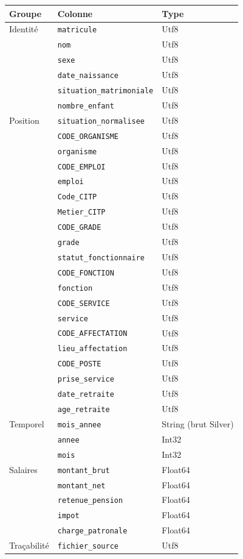 \documentclass[12pt,a4paper,french]{report}
\begin{document}
\begin{longtable}{lll}
  \toprule
  \textbf{Groupe} & \textbf{Colonne} & \textbf{Type} \\
  \midrule
  \endhead
  Identité & \texttt{matricule} & Utf8 \\
  & \texttt{nom} & Utf8 \\
  & \texttt{sexe} & Utf8 \\
  & \texttt{date\_naissance} & Utf8 \\
  & \texttt{situation\_matrimoniale} & Utf8 \\
  & \texttt{nombre\_enfant} & Utf8 \\
  \midrule
  Position & \texttt{situation\_normalisee} & Utf8 \\
  & \texttt{CODE\_ORGANISME} & Utf8 \\
  & \texttt{organisme} & Utf8 \\
  & \texttt{CODE\_EMPLOI} & Utf8 \\
  & \texttt{emploi} & Utf8 \\
  & \texttt{Code\_CITP} & Utf8 \\
  & \texttt{Metier\_CITP} & Utf8 \\
  & \texttt{CODE\_GRADE} & Utf8 \\
  & \texttt{grade} & Utf8 \\
  & \texttt{statut\_fonctionnaire} & Utf8 \\
  & \texttt{CODE\_FONCTION} & Utf8 \\
  & \texttt{fonction} & Utf8 \\
  & \texttt{CODE\_SERVICE} & Utf8 \\
  & \texttt{service} & Utf8 \\
  & \texttt{CODE\_AFFECTATION} & Utf8 \\
  & \texttt{lieu\_affectation} & Utf8 \\
  & \texttt{CODE\_POSTE} & Utf8 \\
  & \texttt{prise\_service} & Utf8 \\
  & \texttt{date\_retraite} & Utf8 \\
  & \texttt{age\_retraite} & Utf8 \\
  \midrule
  Temporel & \texttt{mois\_annee} & String (brut Silver) \\
  & \texttt{annee} & Int32 \\
  & \texttt{mois} & Int32 \\
  \midrule
  Salaires & \texttt{montant\_brut} & Float64 \\
  & \texttt{montant\_net} & Float64 \\
  & \texttt{retenue\_pension} & Float64 \\
  & \texttt{impot} & Float64 \\
  & \texttt{charge\_patronale} & Float64 \\
  \midrule
  Traçabilité & \texttt{fichier\_source} & Utf8 \\
  \bottomrule
\end{longtable}
\end{document}

